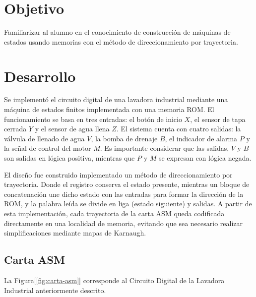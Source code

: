 \documentclass[letterpaper,12pt]{article}
\begin{document}

\newpage

\section{Objetivo}

Familiarizar al alumno en el conocimiento de construcción de máquinas de estados usando memorias con el método de direccionamiento por trayectoria.

\section{Desarrollo}

Se implementó el circuito digital de una lavadora industrial mediante una máquina de estados finitos implementada con una memoria ROM. El funcionamiento se basa en tres entradas: el botón de inicio $X$, el sensor de tapa cerrada $Y$ y el sensor de agua llena $Z$. El sistema cuenta con cuatro salidas: la válvula de llenado de agua $V$, la bomba de drenaje $B$, el indicador de alarma $P$ y la señal de control del motor $M$. Es importante considerar que las salidas, $V$ y $B$ son salidas en lógica positiva, mientras que $P$ y $M$ se expresan con lógica negada.

El diseño fue construido implementado un método de direccionamiento por trayectoria. Donde el registro conserva el estado presente, mientras un bloque de concatenación une dicho estado con las entradas para formar la dirección de la ROM, y la palabra leída se divide en liga (estado siguiente) y salidas. A partir de esta implementación, cada trayectoria de la carta ASM queda codificada directamente en una localidad de memoria, evitando que sea necesario realizar simplificaciones mediante mapas de Karnaugh.

\clearpage
\subsection{Carta ASM}

La Figura[\ref{fig:carta-asm}] corresponde al Circuito Digital de la Lavadora Industrial anteriormente descrito. 
\end{document}
